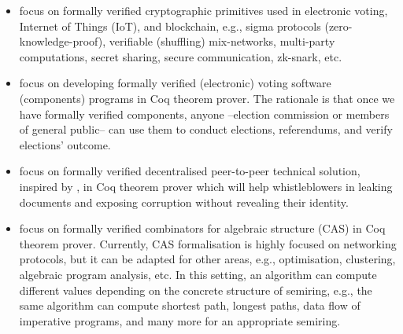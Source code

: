 \documentclass[a4paper]{article}
\begin{document}
\begin{itemize}



\item focus on formally verified cryptographic primitives used in electronic voting, 
  Internet of Things (IoT), and blockchain, e.g., 
	sigma protocols (zero-knowledge-proof), verifiable (shuffling) mix-networks, 
	multi-party computations, secret sharing, secure communication, zk-snark, etc. 
	
\item focus on developing formally verified (electronic) voting 
software (components) programs in Coq theorem prover. 
The rationale is that once we have formally verified 
components, anyone --election commission or members of general public-- can use them 
to conduct elections, referendums, and verify elections' outcome.

\item focus on formally verified decentralised peer-to-peer technical solution, inspired by 
\cite{liu2004linkable, Clarke2001, schimmer2009peer}, in Coq theorem prover which will help 
whistleblowers in leaking documents and exposing corruption without revealing their identity. 



\item focus on formally verified combinators for algebraic structure (CAS) in Coq theorem prover. 
	Currently, CAS formalisation is highly focused on networking protocols, but it can be 
	adapted for other areas, e.g., optimisation, clustering, algebraic program 
	analysis, etc. In this setting, an algorithm can compute different values depending 
	on the concrete structure of semiring, e.g., the same algorithm 
	can compute shortest path, longest paths, 
	data flow of imperative programs, and many more \cite{gondran2008graphs} 
	for an appropriate semiring.
	

\end{itemize}


 

\end{document}
